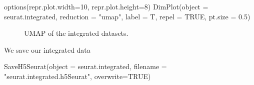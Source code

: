 \documentclass[
  letterpaper,
  DIV=11,
  numbers=noendperiod]{scrartcl}
\newenvironment{Shaded}{\begin{snugshade}}{\end{snugshade}}
\newcommand{\AttributeTok}[1]{\textcolor[rgb]{0.40,0.45,0.13}{#1}}
\newcommand{\ConstantTok}[1]{\textcolor[rgb]{0.56,0.35,0.01}{#1}}
\newcommand{\DecValTok}[1]{\textcolor[rgb]{0.68,0.00,0.00}{#1}}
\newcommand{\FloatTok}[1]{\textcolor[rgb]{0.68,0.00,0.00}{#1}}
\newcommand{\FunctionTok}[1]{\textcolor[rgb]{0.28,0.35,0.67}{#1}}
\newcommand{\NormalTok}[1]{\textcolor[rgb]{0.00,0.23,0.31}{#1}}
\newcommand{\StringTok}[1]{\textcolor[rgb]{0.13,0.47,0.30}{#1}}
\begin{document}
\begin{Shaded}
\begin{Highlighting}[]
\FunctionTok{options}\NormalTok{(}\AttributeTok{repr.plot.width=}\DecValTok{10}\NormalTok{, }\AttributeTok{repr.plot.height=}\DecValTok{8}\NormalTok{)}
\FunctionTok{DimPlot}\NormalTok{(}\AttributeTok{object =}\NormalTok{ seurat.integrated, }\AttributeTok{reduction =} \StringTok{"umap"}\NormalTok{,  }\AttributeTok{label =}\NormalTok{ T, }\AttributeTok{repel =} \ConstantTok{TRUE}\NormalTok{, }\AttributeTok{pt.size =} \FloatTok{0.5}\NormalTok{)}
\end{Highlighting}
\end{Shaded}

\begin{figure}[H]


\caption{\label{fig-umapint}UMAP of the integrated datasets.}

\end{figure}%

We save our integrated data

\begin{Shaded}
\begin{Highlighting}[]
\FunctionTok{SaveH5Seurat}\NormalTok{(}\AttributeTok{object =}\NormalTok{ seurat.integrated, }\AttributeTok{filename =} \StringTok{"seurat.integrated.h5Seurat"}\NormalTok{, }\AttributeTok{overwrite=}\ConstantTok{TRUE}\NormalTok{)}
\end{Highlighting}
\end{Shaded}
\end{document}
